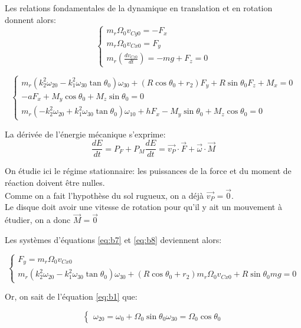 Les relations fondamentales de la dynamique en translation et en rotation donnent alors:
\begin{equation}
  \begin{cases}
    m_r\Omega_0 v_{Cy0}=-F_x \\
    m_r \Omega_0 v_{Cx0}=F_y\\
    m_r(\frac{dv_{Cz0}}{dt})=-mg+F_z=0
  \end{cases}
  \label{eq:b7}
\end{equation}


\begin{equation}
  \begin{cases}
    m_r(k_2^2\omega_{20}-k_1^2\omega_{30} \tan{\theta_0})\omega_{30} +(R\cos{\theta_0}+r_2)F_y + R\sin{\theta_0}F_z + M_x =0\\
    -aF_x + M_y \cos{\theta_0} +M_z \sin{\theta_0}=0\\
    m_r(-k_2^2\omega_{20}+k_1^2\omega_{30} \tan{\theta_0})\omega_{10} + hF_x - M_y \sin{\theta_0} +M_z \cos{\theta_0}=0
  \end{cases}
  \label{eq:b8}
\end{equation}

La dérivée de l'énergie mécanique s'exprime: 
$$
\frac{dE}{dt}=P_F + P_M
\frac{dE}{dt}=\vec{v_P} \cdot \vec{F} + \vec{\omega} \cdot \vec{M}
$$

On étudie ici le régime stationnaire: les puissances de la force et du moment de réaction doivent être nulles. \\
Comme on a fait l'hypothèse du sol rugueux, on a déjà $\vec{v_P}=\vec{0}$. \\
Le disque doit avoir une vitesse de rotation pour qu'il y ait un mouvement à étudier, on a donc $\vec{M}=\vec{0}$

Les systèmes d'équations \ref{eq:b7} et \ref{eq:b8} deviennent alors:

\begin{equation}
  \begin{cases}
    F_y=m_r \Omega_0 v_{Cx0} \\
    m_r(k_2^2\omega_{20}-k_1^2\omega_{30} \tan{\theta_0})\omega_{30} +(R\cos{\theta_0}+r_2)m_r \Omega_0 v_{Cx0} + R\sin{\theta_0}mg =0
  \end{cases}
  \label{eq:b9}
\end{equation}

Or, on sait de l'équation \ref{eq:b1} que:

\begin{equation}
  \begin{cases}
    \omega_{20}=\omega_0 + \Omega_0 \sin{\theta_0}
    \omega_{30}=\Omega_0 \cos{\theta_0}
  \end{cases}
  \label{eq:b10}
\end{equation}

